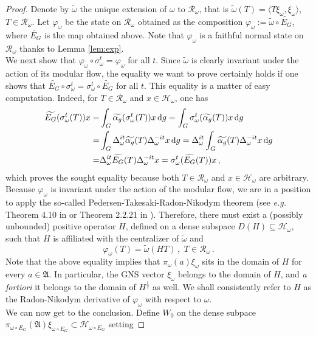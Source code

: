 \documentclass[12pt]{amsart}
\numberwithin{equation}{section}
\def\ch{{\mathcal H}}
\def\ga{{\mathfrak A}} \def\gpa{{\mathfrak a}}
\def\a{\alpha}
\def\s{\sigma} \def\S{\Sigma}
\def\om{\omega} \def\Om{\Omega}
\theoremstyle{definition}
\begin{document}
\begin{proof}
Denote by $\widetilde{\om}$ the unique extension of $\om$ to $\mathcal{R}_\om$, that is
 $\widetilde{\om}(T)=\langle T\xi_\om, \xi_\om \rangle$, $T\in\mathcal{R}_\om$.
Let $\varphi_\om$ be the state on $\mathcal{R}_\om$ obtained as the composition
$\varphi_\om:=\widetilde{\om}\circ\widetilde{E_G}$, where
$\widetilde{E_G}$ is the map obtained above. Note that $\varphi_\om$ is a faithful normal state on
$\mathcal{R}_\om$ thanks to   Lemma \ref{lem:exp}.\\
We next show that $\varphi_\om\circ\s_\om^t=\varphi_\om$ for all  $t$. Since $\widetilde{\om}$ is clearly 
invariant under the action of its modular flow, the  equality we want to prove certainly holds if one shows that 
$\widetilde{E_G}\circ\s_\om^t=\s_\om^t\circ\widetilde{E_G}$ for all $t$. This equality is a matter of easy computation.
Indeed, for $T\in\mathcal{R}_\om$ and $x\in\ch_\om$, one has
\begin{align*}
\widetilde{E_G}(\s_\om^t(T))x=&\int_G \widetilde{\a_g}(\s_\om^t(T))x\,{\rm d} g=
\int_G\s_\om^t(\widetilde{\a_g}(T))x\,{\rm d} g\\
=&\int_G \Delta_\om^{it}\widetilde{\a_g}(T)\Delta_\om^{-it}x\,{\rm d} g=\Delta_\om^{it}\int_G\widetilde{\a_g}(T)\Delta_\om^{-it}x\,{\rm d} g\\
=& \Delta_\om^{it} \widetilde{E_G}(T)\Delta_\om^{-it}x=\s_\om^t(\widetilde{E_G}(T))x\,,
\end{align*}
which proves the sought equality because both $T\in\mathcal{R}_\om$ and $x\in\ch_\om$
are arbitrary.\\
Because $\varphi_\om$ is invariant under the action of the modular flow, we are in a position to apply the so-called Pedersen-Takesaki-Radon-Nikodym theorem (see \emph{e.g.} Theorem 4.10 in \cite{S} or Theorem 2.2.21 in \cite{CS}). Therefore, there must exist a (possibly unbounded) positive operator $H$, defined
on a dense subspace $D(H)\subseteq \ch_\om$, such that $H$ is affiliated with the centralizer of $\widetilde{\om}$ and
$$
\varphi_\om(T)=\widetilde{\om}(HT)\,, \,\, T\in\mathcal{R}_\om\, .
$$
Note that the above equality implies that $\pi_\om(a)\xi_\om$ sits in the domain of $H$ for every $a\in\ga$. In particular,
the GNS vector $\xi_\om$ belongs to the domain of $H$, and \emph{a fortiori} it belongs to the domain of   $H^\frac{1}{2}$ as well. We shall consistently refer to $H$ as the Radon-Nikodym derivative of $\varphi_\om$ with respect to $\om$.\\
We can now get to the conclusion.
Define $W_0$ on the dense subpace $\pi_{\om\circ E_G}(\ga)\xi_{\om\circ E_G}\subset \ch_{\om\circ E_G}$ setting

\end{proof}
\end{document}
